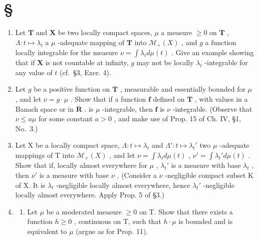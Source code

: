 \section*{\texorpdfstring{\S\CurrentExerciseGroup}{Section \CurrentExerciseGroup}}
{}

\begin{enumerate}
\def\labelenumi{\arabic{enumi})}
\item
  Let \(\mathbf{T}\) and \(\mathbf{X}\) be two locally compact spaces, \(\mu\) a measure \(\geqslant 0\) on \(\mathbf{T}\) , \(\Lambda : t \mapsto \lambda_t\) a \(\mu\) -adequate mapping of \(\mathbf{T}\) into \(\mathcal{M}_+(X)\) , and \(g\) a function locally integrable for the measure \(\nu = \int \lambda_t d\mu(t)\) . Give an example showing that if \(\mathbf{X}\) is not countable at infinity, \(g\) may not be locally \(\lambda_t\) -integrable for any value of \(t\) (cf.~§3, Exer. 4).
\item
  Let \(g\) be a positive function on \(\mathbf{T}\) , measurable and essentially bounded for \(\mu\) , and let \(\nu = g \cdot \mu\) . Show that if a function \(\mathbf{f}\) defined on \(\mathbf{T}\) , with values in a Banach space or in \(\overline{\mathbf{R}}\) . is \(\mu\) -integrable, then \(\mathbf{f}\) is \(\nu\) -integrable. (Observe that \(\nu \leqslant a\mu\) for some constant \(a > 0\) , and make use of Prop. 15 of Ch. IV, §1, No.~3.)
\item
  Let X be a locally compact space, \(\Lambda : t \mapsto \lambda_t\) and \(\Lambda': t \mapsto \lambda_t'\) two \(\mu\) -adequate mappings of T into \(\mathcal{M}_+(X)\) , and let \(\nu = \int \lambda_t d\mu(t)\) , \(\nu' = \int \lambda_t' d\mu(t)\) . Show that if, locally almost everywhere for \(\mu\) , \(\lambda_t'\) is a measure with base \(\lambda_t\) , then \(\nu'\) is a measure with base \(\nu\) . (Consider a \(\nu\) -negligible compact subset K of X. It is \(\lambda_t\) -negligible locally almost everywhere, hence \(\lambda_t'\) -negligible locally almost everywhere. Apply Prop. 5 of §3.)
\item
  \begin{enumerate}
  \def\labelenumii{\alph{enumii})}
  \tightlist
  \item
    Let \(\mu\) be a moderated measure \(\geqslant 0\) on T. Show that there exists a function \(h \geqslant 0\) , continuous on T, such that \(h \cdot \mu\) is bounded and is equivalent to \(\mu\) (argue as for Prop. 11).
  \end{enumerate}
\end{enumerate}

